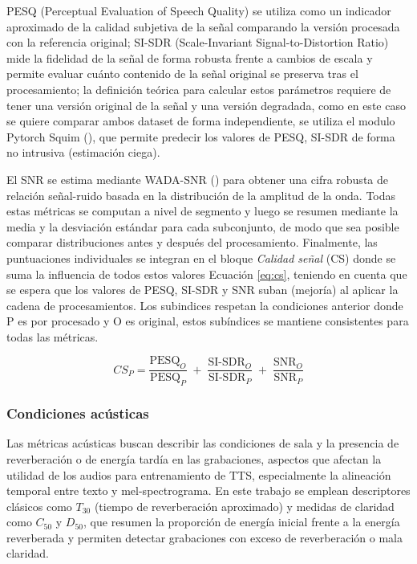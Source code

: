 PESQ (Perceptual Evaluation of Speech Quality) se utiliza como un indicador aproximado de la calidad subjetiva de la señal comparando la versión procesada con la referencia original; SI-SDR (Scale-Invariant Signal-to-Distortion Ratio) mide la fidelidad de la señal de forma robusta frente a cambios de escala y permite evaluar cuánto contenido de la señal original se preserva tras el procesamiento; la definición teórica para calcular estos parámetros requiere de tener una versión original de la señal y una versión degradada, como en este caso se quiere comparar ambos dataset de forma independiente, se utiliza el modulo Pytorch Squim (\cite{squim}), que permite predecir los valores de PESQ, SI-SDR de forma no intrusiva (estimación ciega).

El SNR se estima mediante WADA-SNR (\cite{wada}) para obtener una cifra robusta de relación señal-ruido basada en la distribución de la amplitud de la onda. Todas estas métricas se computan a nivel de segmento y luego se resumen mediante la media y la desviación estándar para cada subconjunto, de modo que sea posible comparar distribuciones antes y después del procesamiento. Finalmente, las puntuaciones individuales se integran en el bloque \emph{Calidad señal} (CS) donde se suma la influencia de todos estos valores Ecuación \ref{eq:cs}, teniendo en cuenta que se espera que los valores de PESQ, SI-SDR y SNR suban (mejoría) al aplicar la cadena de procesamientos. Los subindices respetan la condiciones anterior donde P es por procesado y O es original, estos subíndices se mantiene consistentes para todas las métricas.

\begin{equation}
\label{eq:cs}
CS_P = 
\frac{\mathrm{PESQ}_O}{\mathrm{PESQ}_P}
\;+\; \frac{\mathrm{SI\text{-}SDR}_O}{\mathrm{SI\text{-}SDR}_P}
\;+\; \frac{\mathrm{SNR}_O}{\mathrm{SNR}_P}
\end{equation}

\subsubsection{Condiciones acústicas}
Las métricas acústicas buscan describir las condiciones de sala y la presencia de reverberación o de energía tardía en las grabaciones, aspectos que afectan la utilidad de los audios para entrenamiento de TTS, especialmente la alineación temporal entre texto y mel-spectrograma. En este trabajo se emplean descriptores clásicos como $T_{30}$ (tiempo de reverberación aproximado) y medidas de claridad como $C_{50}$ y $D_{50}$, que resumen la proporción de energía inicial frente a la energía reverberada y permiten detectar grabaciones con exceso de reverberación o mala claridad.

